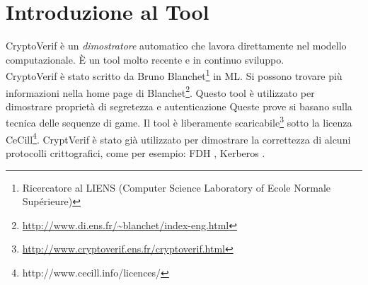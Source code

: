 \documentclass[a4paper,openright,twoside,12pt]{report}
\begin{document}
\section{Introduzione al Tool}
CryptoVerif \`e un \emph{dimostratore} automatico che lavora direttamente nel modello computazionale. \`E un tool molto recente e in continuo sviluppo.\\
CryptoVerif \`e stato scritto da Bruno Blanchet\footnote{Ricercatore al LIENS (Computer Science Laboratory of Ecole Normale Supérieure)} in ML. 
Si possono trovare pi\`u informazioni nella home page di Blanchet\footnote{\url{http://www.di.ens.fr/~blanchet/index-eng.html}}.
Questo tool \`e utilizzato per dimostrare propriet\`a di segretezza e autenticazione Queste prove si basano sulla tecnica delle sequenze di game.
Il tool \`e liberamente scaricabile\footnote{\url{http://www.cryptoverif.ens.fr/cryptoverif.html}} sotto la licenza CeCill\footnote{http://www.cecill.info/licences/}.
CryptVerif \`e stato gi\`a utilizzato per dimostrare la correttezza di alcuni protocolli crittografici, come per esempio: FDH \cite{BlanchetPointchevalCrypto06}, 
Kerberos \cite{BlanchetJaggardScedrovTsayAsiaCCS08}.
\end{document}
